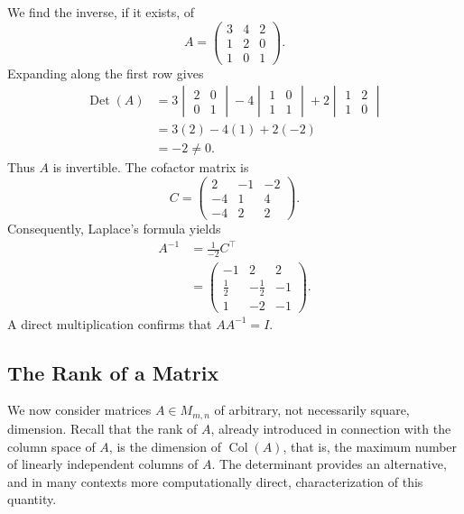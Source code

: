 \begin{example}
We find the inverse, if it exists, of
\[
A = \begin{pmatrix} 3 & 4 & 2 \\ 1 & 2 & 0 \\ 1 & 0 & 1 \end{pmatrix}.
\]
Expanding along the first row gives
\[
\begin{aligned}
\operatorname{Det}(A)
&=3\begin{vmatrix}2&0\\0&1\end{vmatrix}
-4\begin{vmatrix}1&0\\1&1\end{vmatrix}
+2\begin{vmatrix}1&2\\1&0\end{vmatrix}\\
&=3(2)-4(1)+2(-2)\\
&=-2\neq0.
\end{aligned}
\]
Thus $A$ is invertible. The cofactor matrix is
\[
C=\begin{pmatrix}
2&-1&-2\\
-4&1&4\\
-4&2&2
\end{pmatrix}.
\]
Consequently, Laplace's formula yields
\[
\begin{aligned}
A^{-1}
&=\frac{1}{-2}C^{\top}\\
&=\begin{pmatrix}
-1&2&2\\[1mm]
\tfrac12&-\tfrac12&-1\\[1mm]
1&-2&-1
\end{pmatrix}.
\end{aligned}
\]
A direct multiplication confirms that $AA^{-1}=I$.

\end{example}

\subsection{The Rank of a Matrix}

We now consider matrices $A \in M_{m,n}$ of arbitrary, not necessarily square, dimension. Recall that the rank of $A$, already introduced in connection with the column space of $A$, is the dimension of $\operatorname{Col}(A)$, that is, the maximum number of linearly independent columns of $A$. The determinant provides an alternative, and in many contexts more computationally direct, characterization of this quantity.

